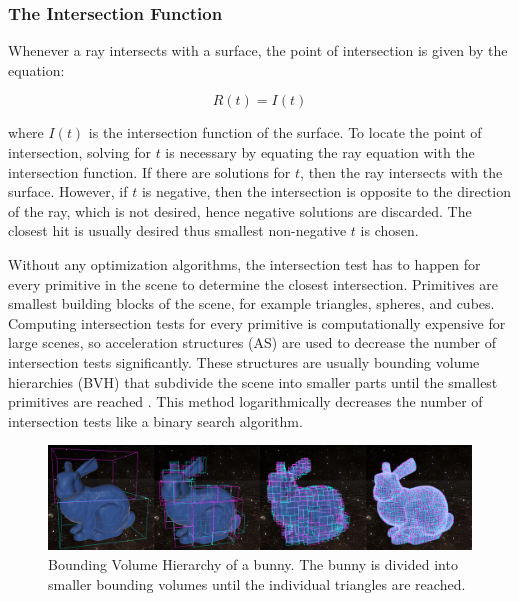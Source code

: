 \documentclass[12pt]{article}
\begin{document}
\subsubsection{The Intersection Function}

Whenever a ray intersects with a surface, the point of intersection is given by the equation:

\begin{equation}
    R(t) = I(t)
\end{equation}

where $I(t)$ is the intersection function of the surface. To locate the point of intersection,
solving for $t$ is necessary by equating the ray equation with the intersection function. 
If there are solutions for $t$, then the ray intersects with the surface. However, 
if $t$ is negative, then the intersection is opposite to the direction of the ray, which is not desired,
hence negative solutions are discarded. The closest hit is usually desired thus smallest non-negative $t$ is chosen.

Without any optimization algorithms, the intersection test has to happen for every primitive in the scene to determine the closest intersection. Primitives are smallest building blocks of the scene, for example triangles, spheres, and cubes.
Computing intersection tests for every primitive is computationally expensive for large scenes, so acceleration structures (AS) are used to decrease the number of intersection tests significantly.
These structures are usually bounding volume hierarchies (BVH) that subdivide the scene into smaller parts until the smallest primitives are reached \parencite{NVIDIA:Raytracing}.
This method logarithmically decreases the number of intersection tests like a binary search algorithm.
\begin{figure}[h]
    \includegraphics[scale=0.22]{BVH-Visualization}
    \caption{
        Bounding Volume Hierarchy of a bunny. 
        The bunny is divided into smaller bounding volumes until the individual triangles are reached.
        \parencite{Medium:BVH-Visualization}}
    \label{fig:BVH-Visualization}
\end{figure}
\end{document}
